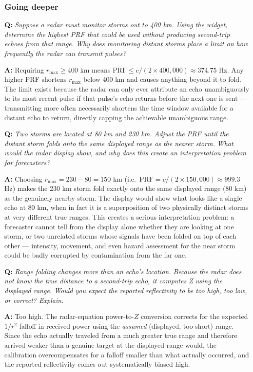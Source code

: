 \documentclass[11pt]{article}
\newenvironment{qa}[1]{\par\noindent\textbf{\color{qgray}Q: }\emph{#1}\par\noindent\textbf{A: }}{\par\vspace{6pt}}
\newcommand{\tier}[1]{\subsubsection*{#1}}
\begin{document}
\tier{Going deeper}
\begin{qa}{Suppose a radar must monitor storms out to 400 km. Using the widget, determine the highest PRF that could be used without producing second-trip echoes from that range. Why does monitoring distant storms place a limit on how frequently the radar can transmit pulses?}
Requiring $r_{\max}\ge400$ km means $\mathrm{PRF}\le c/(2\times400{,}000)\approx374.75$ Hz. Any higher PRF shortens $r_{\max}$ below 400 km and causes anything beyond it to fold. The limit exists because the radar can only ever attribute an echo unambiguously to its most recent pulse if that pulse's echo returns before the next one is sent --- transmitting more often necessarily shortens the time window available for a distant echo to return, directly capping the achievable unambiguous range.
\end{qa}
\begin{qa}{Two storms are located at 80 km and 230 km. Adjust the PRF until the distant storm folds onto the same displayed range as the nearer storm. What would the radar display show, and why does this create an interpretation problem for forecasters?}
Choosing $r_{\max}=230-80=150$ km (i.e.\ $\mathrm{PRF}=c/(2\times150{,}000)\approx999.3$ Hz) makes the 230 km storm fold exactly onto the same displayed range (80 km) as the genuinely nearby storm. The display would show what looks like a single echo at 80 km, when in fact it is a superposition of two physically distinct storms at very different true ranges. This creates a serious interpretation problem: a forecaster cannot tell from the display alone whether they are looking at one storm, or two unrelated storms whose signals have been folded on top of each other --- intensity, movement, and even hazard assessment for the near storm could be badly corrupted by contamination from the far one.
\end{qa}
\begin{qa}{Range folding changes more than an echo's location. Because the radar does not know the true distance to a second-trip echo, it computes Z using the displayed range. Would you expect the reported reflectivity to be too high, too low, or correct? Explain.}
Too high. The radar-equation power-to-$Z$ conversion corrects for the expected $1/r^2$ falloff in received power using the \emph{assumed} (displayed, too-short) range. Since the echo actually traveled from a much greater true range and therefore arrived weaker than a genuine target at the displayed range would, the calibration overcompensates for a falloff smaller than what actually occurred, and the reported reflectivity comes out systematically biased high.
\end{qa}
\end{document}
